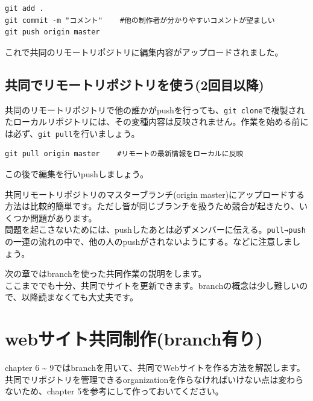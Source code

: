 \documentclass[
]{book}
\begin{document}
\begin{verbatim}
git add .
git commit -m "コメント"    #他の制作者が分かりやすいコメントが望ましい
git push origin master
\end{verbatim}

これで共同のリモートリポジトリに編集内容がアップロードされました。

\hypertarget{ux5171ux540cux3067ux30eaux30e2ux30fcux30c8ux30eaux30ddux30b8ux30c8ux30eaux3092ux4f7fux30462ux56deux76eeux4ee5ux964d}{%
\section{共同でリモートリポジトリを使う(2回目以降)}\label{ux5171ux540cux3067ux30eaux30e2ux30fcux30c8ux30eaux30ddux30b8ux30c8ux30eaux3092ux4f7fux30462ux56deux76eeux4ee5ux964d}}

共同のリモートリポジトリで他の誰かがpushを行っても、\texttt{git\ clone}で複製されたローカルリポジトリには、その変種内容は反映されません。作業を始める前には必ず、\texttt{git\ pull}を行いましょう。

\begin{verbatim}
git pull origin master    #リモートの最新情報をローカルに反映
\end{verbatim}

この後で編集を行いpushしましょう。

共同リモートリポジトリのマスターブランチ(origin master)にアップロードする方法は比較的簡単です。ただし皆が同じブランチを扱うため競合が起きたり、いくつか問題があります。\\
問題を起こさないためには、pushしたあとは必ずメンバーに伝える。\texttt{pull→push}の一連の流れの中で、他の人のpushがされないようにする。などに注意しましょう。　　

次の章ではbranchを使った共同作業の説明をします。\\
ここまででも十分、共同でサイトを更新できます。branchの概念は少し難しいので、以降読まなくても大丈夫です。

\hypertarget{webux30b5ux30a4ux30c8ux5171ux540cux5236ux4f5cbranchux6709ux308a}{%
\chapter{webサイト共同制作(branch有り)}\label{webux30b5ux30a4ux30c8ux5171ux540cux5236ux4f5cbranchux6709ux308a}}

chapter 6 \textasciitilde{} 9ではbranchを用いて、共同でWebサイトを作る方法を解説します。共同でリポジトリを管理できるorganizationを作らなければいけない点は変わらないため、chapter 5を参考にして作っておいてください。 　
\end{document}
